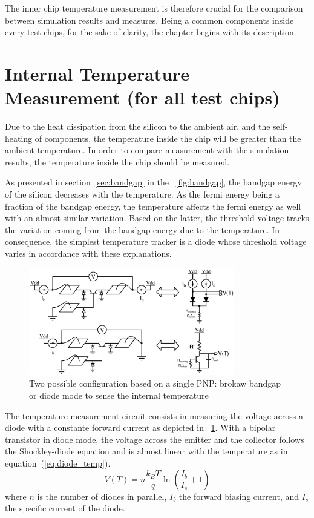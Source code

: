 The inner chip temperature measurement is therefore crucial for the comparison between simulation results and measures. Being a common components inside every test chips, for the sake of clarity, the chapter begins with its description.

\section{Internal Temperature Measurement (for all test chips)}
Due to the heat dissipation from the silicon to the ambient air, and the self-heating of components, the temperature inside the chip will be greater than the ambient temperature. In order to compare measurement with the simulation results, the temperature inside the chip should be measured.

As presented in section~\ref{sec:bandgap} in the \figurename~\ref{fig:bandgap}, the bandgap energy of the silicon decreases with the temperature. As the fermi energy being a fraction of the bandgap energy, the temperature affects the fermi energy as well with an almost similar variation. Based on the latter, the threshold voltage tracks the variation coming from the bandgap energy due to the temperature. In consequence, the simplest temperature tracker is a diode whose threshold voltage varies in accordance with these explanations.

\begin{figure}[htp]
    \centering
    \includegraphics[width=0.8\textwidth]{Chapter5/Figs/temp_test/temperature_sensor_configuration.ps}
    \caption{Two possible configuration based on a single PNP\@: brokaw bandgap or diode mode to sense the internal temperature}
    \label{fig:temp_sensor_bipolar}
\end{figure}

The temperature measurement circuit consists in measuring the voltage across a diode with a constante forward current as depicted in \figurename~\ref{fig:temp_sensor_bipolar}. With a bipolar transistor in diode mode, the voltage across the emitter and the collector follows the Shockley-diode equation and is almost linear with the temperature as in equation~(\ref{eq:diode_temp}). 
\begin{equation}
    \label{eq:diode_temp}
    V(T) = n \frac{k_BT}{q}\ln\left(\frac{I_b}{I_s}+1 \right)
\end{equation}
where $n$ is the number of diodes in parallel, $I_b$ the forward biasing current, and $I_s$ the specific current of the diode.


